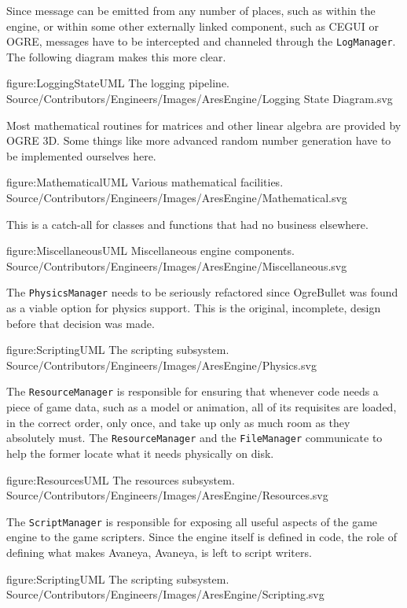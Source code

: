 Since message can be emitted from any number of places, such as within the engine, or within some other externally linked component, such as CEGUI or OGRE, messages have to be intercepted and channeled through the {\tt LogManager}. The following diagram makes this more clear.

\FullPageDiagram
    {figure:LoggingStateUML}
    {The logging pipeline.}
    {Source/Contributors/Engineers/Images/AresEngine/Logging State Diagram.svg}

\page 
{}
Most mathematical routines for matrices and other linear algebra are provided by OGRE 3D. Some things like more advanced random number generation have to be implemented ourselves here.

\FullPageDiagram
    {figure:MathematicalUML}
    {Various mathematical facilities.}
    {Source/Contributors/Engineers/Images/AresEngine/Mathematical.svg}

\page 
{}
This is a catch-all for classes and functions that had no business elsewhere.

\FullPageDiagram
    {figure:MiscellaneousUML}
    {Miscellaneous engine components.}
    {Source/Contributors/Engineers/Images/AresEngine/Miscellaneous.svg}

\page 
{}
The {\tt PhysicsManager} needs to be seriously refactored since OgreBullet was found as a viable option for physics support. This is the original, incomplete, design before that decision was made.

\FullPageDiagram
    {figure:ScriptingUML}
    {The scripting subsystem.}
    {Source/Contributors/Engineers/Images/AresEngine/Physics.svg}

\page 
{}
The {\tt ResourceManager} is responsible for ensuring that whenever code needs a piece of game data, such as a model or animation, all of its requisites are loaded, in the correct order, only once, and take up only as much room as they absolutely must. The {\tt ResourceManager} and the {\tt FileManager} communicate to help the former locate what it needs physically on disk.

\FullPageDiagram
    {figure:ResourcesUML}
    {The resources subsystem.}
    {Source/Contributors/Engineers/Images/AresEngine/Resources.svg}

\page 
{}
The {\tt ScriptManager} is responsible for exposing all useful aspects of the game engine to the game scripters. Since the engine itself is defined in code, the role of defining what makes Avaneya, Avaneya, is left to script writers.

\FullPageDiagram
    {figure:ScriptingUML}
    {The scripting subsystem.}
    {Source/Contributors/Engineers/Images/AresEngine/Scripting.svg}

